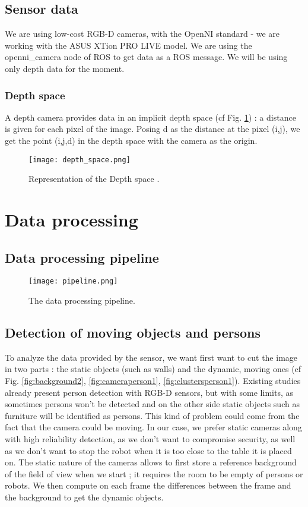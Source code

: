 \documentclass[smallextended]{svjour3}
\begin{document}
\subsection{Sensor data}

We are using low-cost RGB-D cameras, with the OpenNI standard - we are working with the ASUS XTion PRO LIVE model. We are using the openni\_camera node of ROS \cite{Refopenni} to get data as a ROS message. We will be using only depth data for the moment.

\subsubsection{Depth space}
A depth camera provides data in an implicit depth space (cf Fig. \ref{fig:depth_space}) : a distance is given for each pixel of the image. Posing d as the distance at the pixel (i,j), we get the point (i,j,d) in the depth space with the camera as the origin.

\begin{figure}[H]
\centering
\texttt{[image: depth\_space.png]}
\caption{\label{fig:depth_space}Representation of the Depth space \cite{Ref1}.}
\end{figure}

\section{Data processing}

\subsection{Data processing pipeline}

\begin{figure}[H]
\centering
\texttt{[image: pipeline.png]}
\caption{\label{fig:pipeline}The data processing pipeline.}
\end{figure}

\subsection{Detection of moving objects and persons}

To analyze the data provided by the sensor, we want first want to cut the image in two parts : the static objects (such as walls) and the dynamic, moving ones (cf Fig. \ref{fig:background2}, \ref{fig:cameraperson1}, \ref{fig:clustersperson1}). Existing studies already present person detection with RGB-D sensors, but with some limits, as sometimes persons won't be detected and on the other side static objects such as furniture will be identified as persons. This kind of problem could come from the fact that the camera could be moving.
In our case, we prefer static cameras along with high reliability detection, as we don't want to compromise security, as well as we don't want to stop the robot when it is too close to the table it is placed on. The static nature of the cameras allows to first store a reference background of the field of view when we start ; it requires the room to be empty of persons or robots. We then compute on each frame the differences between the frame and the background to get the dynamic objects.
\end{document}
